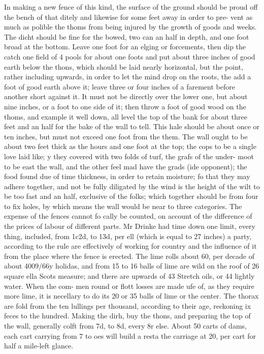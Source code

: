 \documentclass{article}
\begin{document}
In making a new fence of this kind, the surface of the ground should be proud off the bench of that ditely and likewise for some feet away in order to pre- vent as much as polible the thoms from being injured by the growth of goods and weeks. The dicht should be fine for the bowed, two can an half in depth, and one foot broad at the bottom. Leave one foot for an elging or forcements, then dip the catch one field of 4 pools for about one foots and put about three inches of good earth below the thons, which should be laid nearly horizontal, but the point, rather including upwards, in order to let the mind drop on the roots, the add a foot of good earth above it; leave three or four inches of a farement before another short against it. It must not be directly over the lower one, but about nine inches, or a foot to one side of it; then throw a foot of good wood on the thoms, and example it well down, all level the top of the bank for about three feet and an half for the bake of the wall to tell. This hale should be about once or ten inches, but must not exceed one foot from the them. The wall ought to be about two feet thick as the hours and one foot at the top; the cops to be a single love laid like; y they covered with two folds of turf, the grafs of the under- moot to be east the wall, and the other feel mad have the grads (ide opponent); the food found due of time thickness, in order to retain moisture; fo that they may adhere together, and not be fully diligated by the wind is the height of the wilt to be too fast and an half, exclusive of the folks; which together should be from four to fix holes, by which means the wall would be near to three categories. The expense of the fences cannot fo cally be counted, on account of the difference of the prices of labour of different parts. Mr Drinke had time down one limit, every thing, included, from 1c2d, to 13d, per ell (which is equal to 27 inches) a party, according to the rule are effectively of working for country and the influence of it from the place where the fence is erected. The lime rolls about 60, per decade of about 4009/66y holidas, and from 15 to 16 balls of lime are wild on the roof of 26 square ella Scots measure; and there are upwards of 43 Stretch oils, or 44 lightly water. When the com- men round or flott losses are made ufe of, as they require more lime, it is necellary to do its 20 or 35 balls of lime or the center. The thorax are fold from the ten lullings per thousand, according to their age, reckoning ix feces to the hundred. Making the dirh, buy the thons, and preparing the top of the wall, generally colft from 7d, to 8d, every 8r else. About 50 carts of dams, each cart carrying from 7 to oes will build a resta the carriage at 20, per cart for half a mile-left glance.
\end{document}
